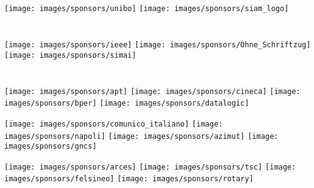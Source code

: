 \newpage
{}

\setlength{\columnseprule}{0pt}
\begin{center}

\section*{\color{siamblue}{ORGANIZED BY}}
\vspace{0.1cm}

\begin{multicols}{4}
\texttt{[image: images/sponsors/unibo]}    
\texttt{[image: images/sponsors/siam\_logo]} 
\end{multicols}

\section*{\color{siamblue}{IN COOPERATION WITH}}
\vspace{0.1cm}

\begin{multicols}{4}
\texttt{[image: images/sponsors/ieee]} 
\texttt{[image: images/sponsors/Ohne\_Schriftzug]} 
\texttt{[image: images/sponsors/simai]}
\end{multicols}

\section*{\color{siamblue}{SPONSOR}}
\vspace{0.1cm}

\begin{multicols}{4}
\texttt{[image: images/sponsors/apt]}    
\texttt{[image: images/sponsors/cineca]} 
\texttt{[image: images/sponsors/bper]}
\texttt{[image: images/sponsors/datalogic]}
\end{multicols}

\begin{multicols}{4}
\texttt{[image: images/sponsors/comunico\_italiano]} 
\texttt{[image: images/sponsors/napoli]} 
\texttt{[image: images/sponsors/azimut]}
\texttt{[image: images/sponsors/gncs]}
\end{multicols}

\begin{multicols}{4}
\texttt{[image: images/sponsors/arces]} 
\texttt{[image: images/sponsors/tsc]} 
\texttt{[image: images/sponsors/felsineo]}
\texttt{[image: images/sponsors/rotary]}
\end{multicols}


\end{center}
